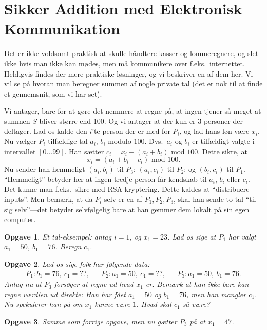 \documentclass{article}
\theoremstyle{opgavedd}
\newtheorem{opgave}{Opgave}[section]
\newcommand\nsmod{\ensuremath{\text{ mod }}}
\begin{document}
\section{Sikker Addition med Elektronisk Kommunikation}
Det er ikke voldsomt praktisk at skulle håndtere kasser og lommeregnere, og slet ikke
hvis man ikke kan mødes, men må kommunikere over f.eks.~internettet. Heldigvis findes der
mere praktiske løsninger, og vi beskriver en af dem her. Vi vil se på hvoran man beregner
summen af nogle private tal (det er nok til at finde et gennemsnit, som vi har set).

Vi antager, bare for at gøre det nemmere at regne på, at ingen tjener så meget at summen
$S$ bliver større end 100. Og vi antager at der kun er 3 personer der deltager. Lad os
kalde den $i$'te person der er med for $P_{i}$, og lad hans løn være $x_{i}$. Nu vælger
$P_{i}$ tilfældige tal $a_{i}$, $b_{i}$ modulo $100$. Dvs.~$a_{i}$ og $b_{i}$ er
tilfældigt valgte i intervallet $[0\dots 99]$. Han sætter
$c_{i}=x_{i}-(a_{i}+b_{i})\nsmod{100}$. Dette sikre, at
\[
  x_{i} = (a_{i} + b_{i} + c_{i}) \nsmod 100.
\]
Nu sender han hemmeligt $(a_{i},b_{i})$ til $P_{3}$; $(a_{i},c_{i})$ til $P_{2}$; og
$(b_{i},c_{i})$ til $P_{1}$. ``Hemmeligt'' betyder her at ingen tredje person får
kendskab til $a_{i}$, $b_{i}$ eller $c_{i}$. Det kunne man f.eks.~sikre med RSA
kryptering. Dette kaldes at ``distribuere inputs''. Men bemærk, at da $P_{i}$ selv er en
af $P_{1}, P_{2}, P_{3}$, skal han sende to tal ``til sig selv''---det betyder
selvfølgelig bare at han gemmer dem lokalt på sin egen computer.

\begin{opgave}
  Et tal-eksempel: antag $i=1$, og $x_{1}=23$. Lad os sige at $P_{1}$ har valgt
  $a_{1}=50$, $b_{1}=76$. Beregn $c_{1}$.
\end{opgave}

\begin{opgave}
  Lad os sige folk har følgende data:
  \begin{align*}
    P_{1}: b_{1} = 76,\ c_{1} = \text{??},
    && P_{2} : a_{1} = 50,\ c_{1} = \text{??},
    && P_{3}:a_{1}=50,\ b_{1}=76.
  \end{align*}
  Antag nu at $P_{3}$ forsøger at regne ud hvad $x_{1}$ er. Bemærk at han ikke bare kan
  regne værdien ud direkte: Han har fået $a_{1} = 50$ og $b_{1} = 76$, men han mangler
  $c_{1}$. Nu spekulerer han på om $x_{1}$ kunne være $1$. Hvad skal $c_{1}$ så være?
\end{opgave}

\begin{opgave}
  Samme som forrige opgave, men nu gætter $P_{3}$ på at $x_{1}=47$.
\end{opgave}
\end{document}

